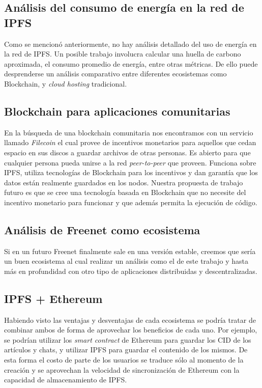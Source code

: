 \subsection{Análisis del consumo de energía en la red de IPFS}

Como se mencionó anteriormente, no hay análisis detallado del uso de energía en la red de IPFS. Un posible trabajo involucra calcular una huella de carbono aproximada, el consumo promedio de energía, entre otras métricas. De ello puede desprenderse un análisis comparativo entre diferentes ecosistemas como Blockchain, y \textit{cloud hosting} tradicional.

\subsection{Blockchain para aplicaciones comunitarias}

En la búsqueda de una blockchain comunitaria nos encontramos con un servicio llamado \textit{Filecoin} \cite{filecoin} el cual provee de incentivos monetarios para aquellos que cedan espacio en sus discos a guardar archivos de otras personas. Es abierto para que cualquier persona pueda unirse a la red \textit{peer-to-peer} que proveen. Funciona sobre IPFS, utiliza tecnologías de Blockchain para los incentivos y dan garantía que los datos están realmente guardados en los nodos. Nuestra propuesta de trabajo futuro es que se cree una tecnología basada en Blockchain que no necesite del incentivo monetario para funcionar y que además permita la ejecución de código.

\subsection{Análisis de Freenet como ecosistema}

Si en un futuro Freenet finalmente sale en una versión estable, creemos que sería un buen ecosistema al cual realizar un análisis como el de este trabajo y hasta más en profundidad con otro tipo de aplicaciones distribuidas y descentralizadas.

\subsection{IPFS + Ethereum}

Habiendo visto las ventajas y desventajas de cada ecosistema se podría tratar de combinar ambos de forma de aprovechar los beneficios de cada uno. Por ejemplo, se podrían utilizar los \textit{smart contract} de Ethereum para guardar los CID de los artículos y chats, y utilizar IPFS para guardar el contenido de los mismos. De esta forma el costo de parte de los usuarios se traduce sólo al momento de la creación y se aprovechan la velocidad de sincronización de Ethereum con la capacidad de almacenamiento de IPFS.
